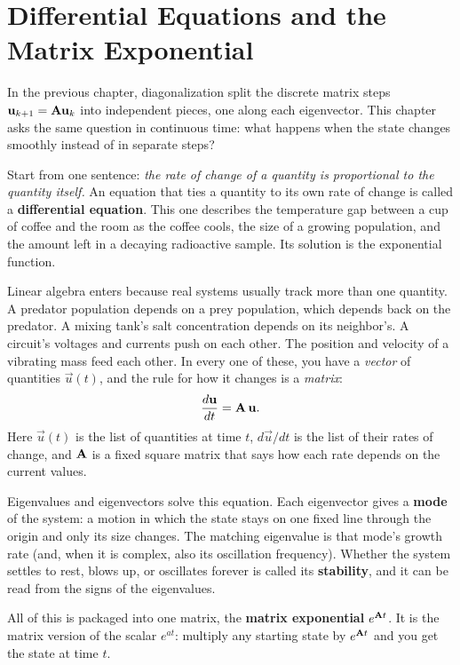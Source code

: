 \chapter{Differential Equations and the Matrix Exponential}

In the previous chapter, diagonalization split the discrete matrix steps
$\mathbf{u}_{k+1} = \mathbf{A}\mathbf{u}_k$ into independent pieces, one along each
eigenvector. This chapter asks the same question in continuous time: what
happens when the state changes smoothly instead of in separate steps?

Start from one sentence: \emph{the rate of change of a quantity is proportional
to the quantity itself.} An equation that ties a quantity to its own rate of
change is called a \textbf{differential equation}. This one describes the
temperature gap between a cup of coffee and the room as the coffee cools, the
size of a growing population, and the amount left in a decaying radioactive
sample. Its solution is the exponential function.

Linear algebra enters because real systems usually track more than one quantity.
A predator population depends on a prey population, which depends back on the
predator. A mixing tank's salt concentration depends on its neighbor's. A
circuit's voltages and currents push on each other. The position and velocity of
a vibrating mass feed each other. In every one of these, you have a \emph{vector}
of quantities $\vec{u}(t)$, and the rule for how it changes is a \emph{matrix}:
\[
  \frac{d\mathbf{u}}{dt} = \mathbf{A}\,\mathbf{u}.
\]
Here $\vec{u}(t)$ is the list of quantities at time $t$, $d\vec{u}/dt$ is the
list of their rates of change, and $\mathbf{A}$ is a fixed square matrix that says
how each rate depends on the current values.

Eigenvalues and eigenvectors solve this equation. Each eigenvector gives a
\textbf{mode} of the system: a motion in which the state stays on one fixed
line through the origin and only its size changes. The matching eigenvalue is
that mode's growth rate (and, when it is complex, also its oscillation
frequency). Whether the system settles to rest, blows up, or oscillates
forever is called its \textbf{stability}, and it can be read from the signs
of the eigenvalues.

All of this is packaged into one matrix, the \textbf{matrix exponential}
$e^{\mathbf{A}t}$. It is the matrix version of the scalar $e^{at}$: multiply any
starting state by $e^{\mathbf{A}t}$ and you get the state at time $t$.


